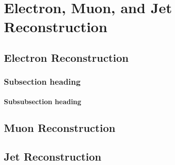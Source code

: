

\chapter{Electron, Muon, and Jet Reconstruction}

\section{Electron Reconstruction}





\subsection{Subsection heading}

\subsubsection{Subsubsection heading}


\section{Muon Reconstruction}




\section{Jet Reconstruction}
